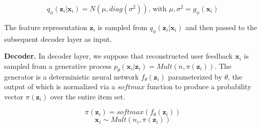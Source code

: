 


\begin{equation}
q_\phi(\mathbf{z}_i\lvert\mathbf{x}_i)= N(\mu,diag(\sigma^{2})) \text{, with } \mu,\sigma^2=g_\phi(\mathbf{x}_i)
\label{eq1}
\end{equation}

The feature representation $\mathbf{z}_i$ is sampled from $q_\phi(\mathbf{z}_i\lvert\mathbf{x}_i)$ and then passed to the subsequent decoder layer as input.


\textbf{Decoder.} In decoder layer, we suppose that reconstructed user feedback $\mathbf{x}_i$ is sampled from a generative process $p_{\theta} { \left( \mathbf{x}_i \lvert \mathbf{z}_i \right) = Mult(n,\pi(\mathbf{z}_i)) }$. The generator is a deterministic neural network $f_\theta(\mathbf{z}_i)$ parameterized by $\theta$, the output of which is normalized via a $softmax$ function to produce a probability vector $\pi\left(\mathbf{z}_i\right)$ over the entire item set.




\begin{equation}
\pi(\mathbf{z}_i)=softmax(f_\theta(\mathbf{z}_i))
\label{eq2}
\end{equation}
\begin{equation}
\mathbf{x}_i \sim  Mult(n_i,\pi(\mathbf{z}_i))
\label{eq3}
\end{equation}

